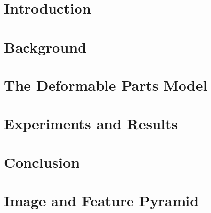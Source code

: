 \documentclass[12pt]{report}
\begin{document}
\tableofcontents
\listoffigures
\listoftables

\chapter{Introduction}


\chapter{Background}\label{chap:back}


\chapter{The Deformable Parts Model}\label{chap:model}


\chapter{Experiments and Results}\label{chap:exp}


\chapter{Conclusion}\label{chap:conclusion} 




\appendix
\chapter{Image and Feature Pyramid}\label{chap:pyra} 

\end{document}
